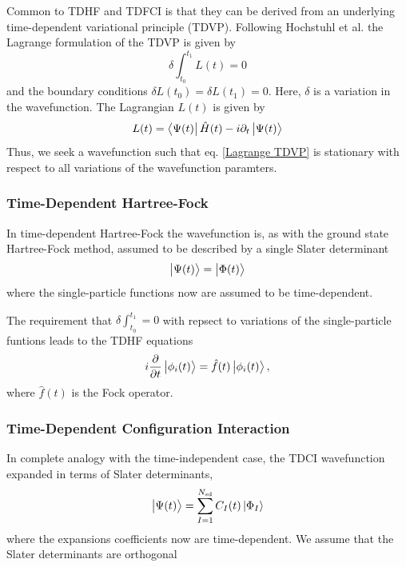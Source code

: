 \documentclass[aip,jcp,reprint,floatfix]{revtex4-1}
\begin{document}
    Common to TDHF and TDFCI is that they can be derived from an underlying time-dependent variational principle (TDVP). Following Hochstuhl et al. the Lagrange formulation of the TDVP is given by
    \begin{equation}
        \delta \int_{t_0}^{t_1} L(t) = 0 \label{Lagrange TDVP}
    \end{equation}
    and the boundary conditions $\delta L(t_0) = \delta L(t_1) = 0$.
    Here, $\delta$ is a variation in the wavefunction.
    The Lagrangian $L(t)$ is given by
    \begin{equation}
        L(t) = \bra{\Psi(t)}\hat{H}(t)-i\partial_t\ket{\Psi(t)}
    \end{equation}
    Thus, we seek a wavefunction such that eq. \ref{Lagrange TDVP} is stationary with respect to all variations of the wavefunction paramters. 
     
    \subsubsection{Time-Dependent Hartree-Fock}
    In time-dependent Hartree-Fock the wavefunction is, as with the ground state Hartree-Fock method, assumed to be described by a single Slater determinant 
    \begin{equation}
        \ket{\Psi(t)} = \ket{\Phi(t)} \label{TDHF ansatz}
    \end{equation}
    where the single-particle functions now are assumed to be time-dependent.
    
    The requirement that $\delta \int_{t_0}^{t_1} = 0$ with repsect to variations of the single-particle funtions leads to the TDHF equations\cite{Hochstuhl2014}
    \begin{equation}
        i \frac{\partial}{\partial t} \ket{\phi_i(t)} = \hat{f}(t) \ket{\phi_i(t)},
    \end{equation}
    where $\hat{f}(t)$ is the Fock operator.
    
    \subsubsection{Time-Dependent Configuration Interaction}
    In complete analogy with the time-independent case, the TDCI wavefunction expanded in terms of Slater determinants,
    \begin{equation}
        \ket{\Psi(t)} = \sum_{I=1}^{N_\text{sd}} C_I(t) \ket{\Phi_I} \label{TDCI ansatz}
    \end{equation}
    where the expansions coefficients now are time-dependent.
    We assume that the Slater determinants are orthogonal
    
\end{document}
